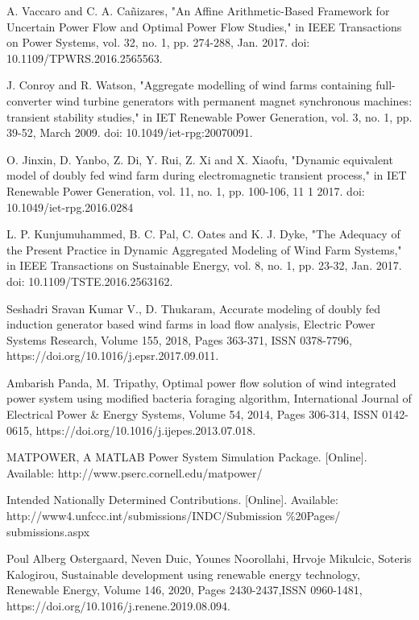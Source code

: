 \begin{thebibliography}{99}
\begin{singlespace}
A. Vaccaro and C. A. Cañizares, "An Affine Arithmetic-Based Framework for Uncertain Power Flow and Optimal Power Flow Studies," in IEEE Transactions on Power Systems, vol. 32, no. 1, pp. 274-288, Jan. 2017. doi: 10.1109/TPWRS.2016.2565563.

 J. Conroy and R. Watson, "Aggregate modelling of wind farms containing full-converter wind turbine generators with permanent magnet synchronous machines: transient stability studies," in IET Renewable Power Generation, vol. 3, no. 1, pp. 39-52, March 2009. doi: 10.1049/iet-rpg:20070091.

 O. Jinxin, D. Yanbo, Z. Di, Y. Rui, Z. Xi and X. Xiaofu, "Dynamic equivalent model of doubly fed wind farm during electromagnetic transient process," in IET Renewable Power Generation, vol. 11, no. 1, pp. 100-106, 11 1 2017. doi: 10.1049/iet-rpg.2016.0284 

 L. P. Kunjumuhammed, B. C. Pal, C. Oates and K. J. Dyke, "The Adequacy of the Present Practice in Dynamic Aggregated Modeling of Wind Farm Systems," in IEEE Transactions on Sustainable Energy, vol. 8, no. 1, pp. 23-32, Jan. 2017. doi: 10.1109/TSTE.2016.2563162.

 Seshadri Sravan Kumar V., D. Thukaram, Accurate modeling of doubly fed induction generator based wind farms in load flow analysis, Electric Power Systems Research, Volume 155, 2018, Pages 363-371, ISSN 0378-7796, https://doi.org/10.1016/j.epsr.2017.09.011.

 Ambarish Panda, M. Tripathy, Optimal power flow solution of wind integrated power system using modified bacteria foraging algorithm, International Journal of Electrical Power \& Energy Systems, Volume 54, 2014, Pages 306-314, ISSN 0142-0615, https://doi.org/10.1016/j.ijepes.2013.07.018.

MATPOWER, A MATLAB Power System Simulation Package. [Online]. Available: http://www.pserc.cornell.edu/matpower/

 Intended Nationally Determined Contributions. [Online]. Available: http://www4.unfccc.int/submissions/INDC/Submission \%20Pages/ submissions.aspx

 Poul Alberg Ostergaard, Neven Duic, Younes Noorollahi, Hrvoje Mikulcic, Soteris Kalogirou, Sustainable development using renewable energy technology, Renewable Energy, Volume 146, 2020, Pages 2430-2437,ISSN 0960-1481, https://doi.org/10.1016/j.renene.2019.08.094.


\end{singlespace}
\end{thebibliography}
